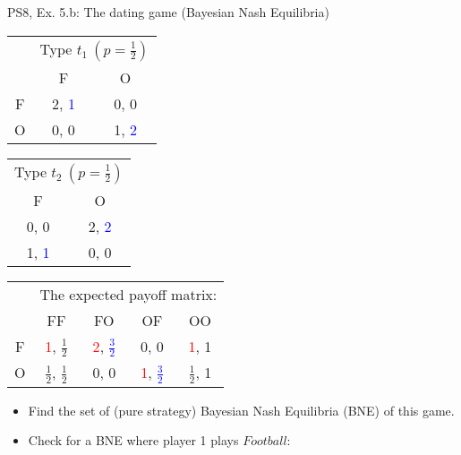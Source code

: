 \begin{frame}{PS8, Ex. 5.b: The dating game (Bayesian Nash Equilibria)}
    \begin{table}
      \begin{tabular}{c|c|c|}
        \multicolumn{1}{c}{} & \multicolumn{2}{c}{Type $t_1\ (p=\frac{1}{2})$} \\
        \multicolumn{1}{c}{} & \multicolumn{1}{c}{F} & \multicolumn{1}{c}{O} \\\cline{2-3}
        F & 2, \textcolor{blue}{1} & 0, 0 \\\cline{2-3}
        O & 0, 0 & 1, \textcolor{blue}{2} \\\cline{2-3}
      \end{tabular}\quad
      \begin{tabular}{|c|c|}
        \multicolumn{2}{c}{Type $t_2\ (p=\frac{1}{2})$} \\
        \multicolumn{1}{c}{F} & \multicolumn{1}{c}{O} \\\cline{1-2}
        0, 0 & 2, \textcolor{blue}{2} \\\cline{1-2}
        1, \textcolor{blue}{1} & 0, 0 \\\cline{1-2}
      \end{tabular}
      \begin{tabular}{c|c|c|c|c|}
        \multicolumn{1}{c}{} & \multicolumn{4}{c}{The expected payoff matrix:} \\
        \multicolumn{1}{c}{} & \multicolumn{1}{c}{FF} & \multicolumn{1}{c}{FO} & \multicolumn{1}{c}{OF} & \multicolumn{1}{c}{OO} \\\cline{2-5}
        F & \textcolor{red}{1}, $\frac{1}{2}$ & \textcolor{red}{2}, \textcolor{blue}{$\frac{3}{2}$} & 0, 0 & \textcolor{red}{1}, 1 \\\cline{2-5}
        O & $\frac{1}{2}$, $\frac{1}{2}$ & 0, 0 & \textcolor{red}{1}, \textcolor{blue}{$\frac{3}{2}$} & $\frac{1}{2}$, 1  \\\cline{2-5}
      \end{tabular}
    \end{table}
    \begin{itemize}
      \item[(b)] Find the set of (pure strategy) Bayesian Nash Equilibria (BNE) of this game.
    \end{itemize}
    \vspace{-6pt}
    \begin{multicols}{2}
      \begin{itemize}
        \item[Step 1:] Check for a BNE where player 1 plays $Football$:

\end{itemize}
\end{multicols}
\end{frame}
